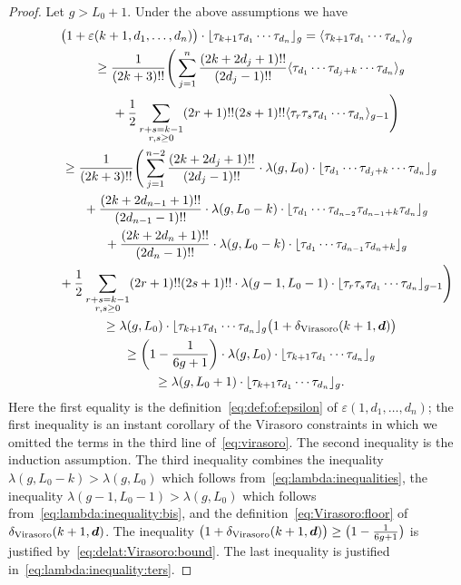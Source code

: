 \documentclass[pdftex]{sigma}
\renewcommand{\epsilon}{\varepsilon}
\theoremstyle{definition}
\begin{document}
\begin{proof}
Let $g> L_0+1$. Under the above assumptions we have
\begin{gather*}
\big(1+\epsilon(k+1,d_1,\dots,d_n)\big)\cdot\lfloor\tau_{k+1}\tau_{d_1}\cdots\tau_{d_n}\rfloor_g
=\langle\tau_{k+1}\tau_{d_1}\cdots\tau_{d_n}\rangle_g
 \\
 \qquad{} \ge
\frac{1}{(2k+3)!!}
\Bigg(\sum_{j=1}^n
\frac{(2k+2d_j+1)!!}{(2d_j-1)!!}\langle\tau_{d_1}\cdots
\tau_{d_{j}+k}\cdots\tau_{d_n}\rangle_g\\
\qquad\quad{} +\frac{1}{2}\sum_{\substack{r+s=k-1\\r,s\ge 0}}
(2r+1)!!(2s+1)!!\langle\tau_r\tau_s\tau_{d_1}\cdots\tau_{d_n}\rangle_{g-1}
\Bigg)
\\ \qquad{} \ge
\frac{1}{(2k+3)!!}
\Bigg(\sum_{j=1}^{n-2}
\frac{(2k+2d_j+1)!!}{(2d_j-1)!!}
\cdot\lambda(g,L_0)\cdot
\lfloor\tau_{d_1}\cdots
\tau_{d_{j}+k}\cdots\tau_{d_n}\rfloor_g
\\
\qquad\quad {}+\frac{(2k+2d_{n-1}+1)!!}{(2d_{n-1}-1)!!}
\cdot\lambda(g,L_0-k)\cdot
\lfloor\tau_{d_1}\cdots\tau_{d_{n-2}}
\tau_{d_{n-1}+k}\tau_{d_n}\rfloor_g
\\
\qquad\quad {}+\frac{(2k+2d_{n}+1)!!}{(2d_{n}-1)!!}
\cdot\lambda(g,L_0-k)\cdot
\lfloor\tau_{d_1}\cdots\tau_{d_{n-1}}
\tau_{d_{n}+k}\rfloor_g
\\
\qquad\quad {}+\frac{1}{2}\sum_{\substack{r+s=k-1\\r,s\ge 0}}
(2r+1)!!(2s+1)!!
\cdot\lambda(g-1,L_0-1)\cdot
\lfloor\tau_r\tau_s\tau_{d_1}\cdots\tau_{d_n}\rfloor_{g-1}
\Bigg)
\\
\qquad{} \ge\lambda(g,L_0)\cdot\lfloor\tau_{k+1}\tau_{d_1}\cdots\tau_{d_n}\rfloor_g
\big(1+\delta_{\rm Virasoro}(k+1,\boldsymbol{d})\big)
\\
\qquad{} \ge\left(1-\frac{1}{6g+1}\right)\cdot\lambda(g,L_0)\cdot\lfloor\tau_{k+1}\tau_{d_1}\cdots\tau_{d_n}\rfloor_g
\\
\qquad{} \ge\lambda(g,L_0+1)\cdot\lfloor\tau_{k+1}\tau_{d_1}\cdots\tau_{d_n}\rfloor_g .
\end{gather*}
Here the first equality is
the definition~\eqref{eq:def:of:epsilon}
of $\epsilon(1,d_1,\dots,d_n)$;
the first inequality
is an instant corollary of the
Virasoro constraints in which we omitted
the terms in the third line of~\eqref{eq:virasoro}.
The second inequality is the induction assumption.
The third inequality combines
the inequality $\lambda(g,L_0-k)>\lambda(g,L_0)$
which follows from~\eqref{eq:lambda:inequalities},
the inequality $\lambda(g-1,L_0-1)>\lambda(g,L_0)$
which follows from~\eqref{eq:lambda:inequality:bis},
and the definition~\eqref{eq:Virasoro:floor}
of $\delta_{\rm Virasoro}(k+1,\boldsymbol{d})$.
The inequality
$\big(1+\delta_{\rm Virasoro}(k+1,\boldsymbol{d})\big)\ge
\big(1-\frac{1}{6g+1}\big)$ is justified by~\eqref{eq:delat:Virasoro:bound}.
The last inequality is justified in~\eqref{eq:lambda:inequality:ters}.


\end{proof}
\end{document}

